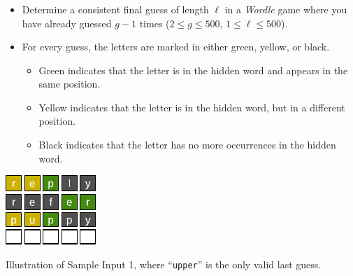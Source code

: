 \begin{frame}
    \frametitle{\problemtitle}

    \begin{itemize}
        \item Determine a consistent final guess of length $\ell$ in a \emph{Wordle} game
        where you have already guessed $g - 1$ times ($2 \leq g \leq 500$, $1 \leq \ell \leq 500$).
        \item For every guess, the letters are marked in either green, yellow, or black.
        \begin{itemize}
            \item Green indicates that the letter is in the hidden word and appears in the same position.
            \item Yellow indicates that the letter is in the hidden word, but in a different position.
            \item Black indicates that the letter has no more occurrences in the hidden word.
        \end{itemize}
    \end{itemize}

    \vspace{2em}

    \centering
    \includegraphics[height=0.3\textheight]{sample}

    \small
    Illustration of Sample Input 1, where ``\texttt{upper}'' is the only valid last guess.
\end{frame}
